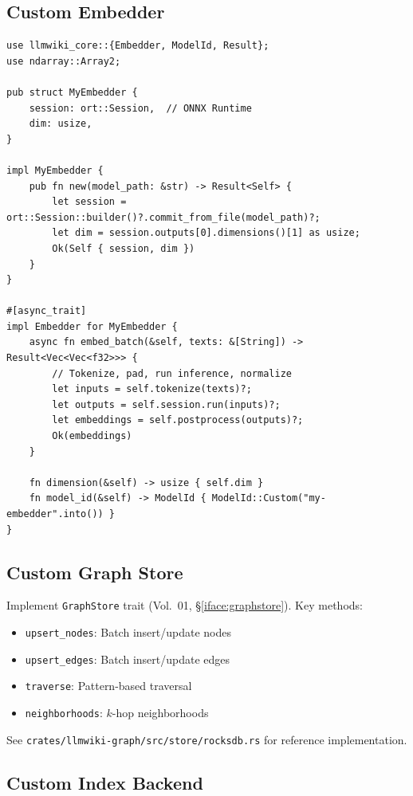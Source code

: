 \subsection{Custom Embedder}
\label{sec:dev:embedder}

\begin{verbatim}
use llmwiki_core::{Embedder, ModelId, Result};
use ndarray::Array2;

pub struct MyEmbedder {
    session: ort::Session,  // ONNX Runtime
    dim: usize,
}

impl MyEmbedder {
    pub fn new(model_path: &str) -> Result<Self> {
        let session = ort::Session::builder()?.commit_from_file(model_path)?;
        let dim = session.outputs[0].dimensions()[1] as usize;
        Ok(Self { session, dim })
    }
}

#[async_trait]
impl Embedder for MyEmbedder {
    async fn embed_batch(&self, texts: &[String]) -> Result<Vec<Vec<f32>>> {
        // Tokenize, pad, run inference, normalize
        let inputs = self.tokenize(texts)?;
        let outputs = self.session.run(inputs)?;
        let embeddings = self.postprocess(outputs)?;
        Ok(embeddings)
    }

    fn dimension(&self) -> usize { self.dim }
    fn model_id(&self) -> ModelId { ModelId::Custom("my-embedder".into()) }
}
\end{verbatim}

\subsection{Custom Graph Store}
\label{sec:dev:graph-store}

Implement \texttt{GraphStore} trait (Vol.~01, \S\ref{iface:graphstore}). Key methods:
\begin{itemize}
  \item \texttt{upsert\_nodes}: Batch insert/update nodes
  \item \texttt{upsert\_edges}: Batch insert/update edges
  \item \texttt{traverse}: Pattern-based traversal
  \item \texttt{neighborhoods}: $k$-hop neighborhoods
\end{itemize}

See \texttt{crates/llmwiki-graph/src/store/rocksdb.rs} for reference implementation.

\subsection{Custom Index Backend}
\label{sec:dev:index-backend}

